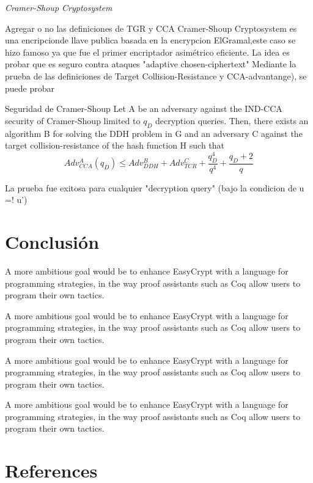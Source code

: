 \documentclass[runningheads,a4paper]{llncs}
\begin{document}
\centerline{\emph{Cramer-Shoup Cryptosystem}}

Agregar o no las definiciones de TGR y CCA
Cramer-Shoup Cryptosystem es una encripcionde llave publica basada en la encrypcion ElGramal,este caso se hizo famoso ya que fue el primer encriptador asimétrico eficiente. La idea es probar que es seguro contra ataques "adaptive chosen-ciphertext"
Mediante la prueba de las definiciones de Target Collision-Resistance y CCA-advantange), se puede probar
\begin{theorem}{Seguridad de Cramer-Shoup}
Let A be an adversary against the IND-CCA security
of Cramer-Shoup limited to $q_D$ decryption queries. Then, there exists an algorithm B for solving the
DDH problem in G and an adversary C against the target collision-resistance of the hash function H
such that
\[Adv_{CCA}^A(q_D) \leq Adv_{DDH}^B + Adv_{TCR}^C + \frac{q_D^4}{q^4} + \frac{q_D + 2}{q}\]
\end{theorem}
La prueba fue exitosa para cualquier "decryption query" (bajo la condicion de u =! u')\cite{article3}


\section{Conclusión}

A more ambitious goal
would be to enhance EasyCrypt with a language for programming strategies, in
the way proof assistants such as Coq allow users to program their own tactics.

A more ambitious goal
would be to enhance EasyCrypt with a language for programming strategies, in
the way proof assistants such as Coq allow users to program their own tactics.

A more ambitious goal
would be to enhance EasyCrypt with a language for programming strategies, in
the way proof assistants such as Coq allow users to program their own tactics.

A more ambitious goal
would be to enhance EasyCrypt with a language for programming strategies, in
the way proof assistants such as Coq allow users to program their own tactics.

\section{References}
\end{document}
